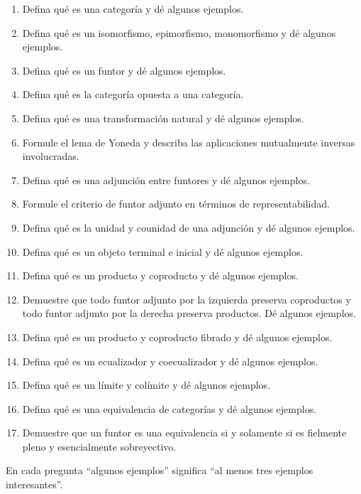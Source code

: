 \documentclass{article}
\numberwithin{equation}{section}
\theoremstyle{definition}
\begin{document}
\begin{enumerate}
\item Defina qué es una categoría y dé algunos ejemplos.

\item Defina qué es un isomorfismo, epimorfismo, monomorfismo y dé algunos ejemplos.

\item Defina qué es un funtor y dé algunos ejemplos.

\item Defina qué es la categoría opuesta a una categoría.

\item Defina qué es una transformación natural y dé algunos ejemplos.

\item Formule el lema de Yoneda y describa las aplicaciones mutualmente inversas involucradas.

\item Defina qué es una adjunción entre funtores y dé algunos ejemplos.

\item Formule el criterio de funtor adjunto en términos de representabilidad.

\item Defina qué es la unidad y counidad de una adjunción y dé algunos ejemplos.

\item Defina qué es un objeto terminal e inicial y dé algunos ejemplos.

\item Defina qué es un producto y coproducto y dé algunos ejemplos.

\item Demuestre que todo funtor adjunto por la izquierda preserva coproductos y todo funtor adjunto por la derecha preserva productos. Dé algunos ejemplos.

\item Defina qué es un producto y coproducto fibrado y dé algunos ejemplos.

\item Defina qué es un ecualizador y coecualizador y dé algunos ejemplos.

\item Defina qué es un límite y colímite y dé algunos ejemplos.

\item Defina qué es una equivalencia de categorías y dé algunos ejemplos.

\item Demuestre que un funtor es una equivalencia si y solamente si es fielmente pleno y esencialmente sobreyectivo.
\end{enumerate}

En cada pregunta ``algunos ejemplos'' significa ``al menos tres ejemplos interesantes''.
\fi
\end{document}
